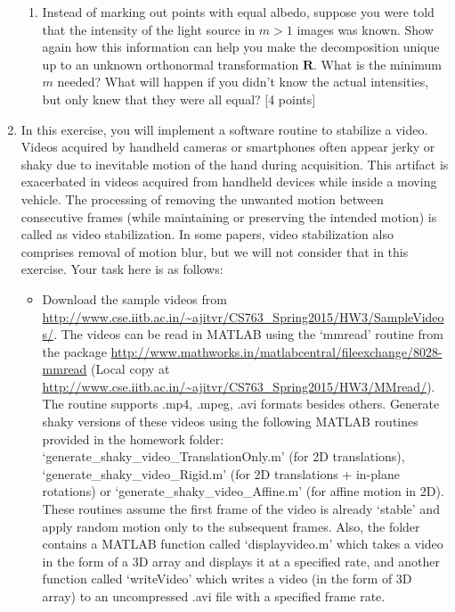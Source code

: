 \documentclass[11pt]{article}
\begin{document}
\begin{enumerate}
\begin{enumerate}
\item Instead of marking out points with equal albedo, suppose you were told that the intensity of the light source in $m > 1$ images was known. Show again how this information can help you make the decomposition unique up to an unknown orthonormal transformation $\mathbf{R}$.  What is the minimum $m$ needed?  What will happen if you didn't know the actual intensities, but only knew that they were all equal? \textsf{[4 points]}
\end{enumerate}

\item In this exercise, you will implement a software routine to stabilize a video. Videos acquired by handheld cameras or smartphones often appear jerky or shaky due to inevitable motion of the hand during acquisition. This artifact is exacerbated in videos acquired from handheld devices while inside a moving vehicle. The processing of removing the unwanted motion between consecutive frames (while maintaining  or preserving the intended motion) is called as video stabilization. In some papers, video stabilization also comprises removal of motion blur, but we will not consider that in this exercise. Your task here is as follows:

\begin{itemize}
\item Download the sample videos from \url{http://www.cse.iitb.ac.in/~ajitvr/CS763_Spring2015/HW3/SampleVideos/}. The videos can be read in MATLAB using the `mmread' routine from the package \url{http://www.mathworks.in/matlabcentral/fileexchange/8028-mmread} (Local copy at \url{http://www.cse.iitb.ac.in/~ajitvr/CS763_Spring2015/HW3/MMread/}). The routine supports .mp4, .mpeg, .avi formats besides others. Generate shaky versions of these videos using the following MATLAB routines provided in the homework folder: `generate\_shaky\_video\_TranslationOnly.m' (for 2D translations), `generate\_shaky\_video\_Rigid.m' (for 2D translations + in-plane rotations) or `generate\_shaky\_video\_Affine.m' (for affine motion in 2D). These routines assume the first frame of the video is already `stable' and apply random motion only to the subsequent frames. Also, the folder contains a  MATLAB function called `displayvideo.m' which takes a video in the form of a 3D array and displays it at a specified rate, and another function called `writeVideo' which writes a video (in the form of  3D array) to an uncompressed .avi file with a specified frame rate. 


\end{itemize}
\end{enumerate}
\end{document}
